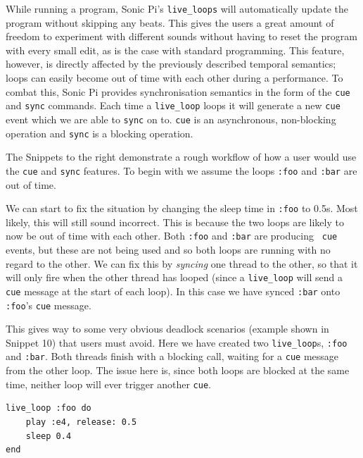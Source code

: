 \documentclass[11pt, abstracton, twoside]{scrartcl}
\begin{document}
While running a program, Sonic Pi's \texttt{live\_loops} will automatically update 
the program without skipping any beats. This gives the users a great amount of 
freedom to experiment with different sounds without having to reset the program
with every small edit, as is the case with standard 
programming. This feature, however, is directly affected by the previously 
described temporal semantics; loops can easily become out of time with 
each other during a performance. To combat this, Sonic Pi provides 
synchronisation semantics in the form of the \texttt{cue} and \texttt{sync} 
commands. Each time a \texttt{live\_loop} loops it will generate a new \texttt{cue} 
event which we are able to \texttt{sync} on to. \texttt{cue} is an asynchronous,
non-blocking operation and \texttt{sync} is a blocking operation.

\begin{multicols}{2}
The Snippets to the right demonstrate a rough workflow of how a user would use 
the \texttt{cue} and \texttt{sync} features. To begin with we assume the loops 
\texttt{:foo} and \texttt{:bar} are out of time.

We can start to fix the situation by 
changing the sleep time in \texttt{:foo} to 0.5s. Most likely, this will still 
sound incorrect. This is because the two loops are likely to now be out of 
time with each other. Both \texttt{:foo} and \texttt{:bar} are producing \texttt{
cue} events, but these are not being used and so both loops are running with 
no regard to the other. We can fix this by \emph{syncing} one thread to the 
other, so that it will only fire when the other thread has looped (since
a \texttt{live\_loop} will send a \texttt{cue} message at the start of each loop).
In this case we have synced \texttt{:bar} onto \texttt{:foo}'s \texttt{cue} 
message.

This gives way to some very obvious deadlock scenarios (example shown in Snippet 10) 
that users must avoid. Here we have created two \texttt{live\_loop}s, \texttt{:foo}
and \texttt{:bar}. Both threads finish with a blocking call, waiting for a
\texttt{cue} message from the other loop. The issue here is, since both loops 
are blocked at the same time, neither loop will ever trigger another \texttt{cue}. 

	\begin{minipage}{0.5\textwidth}

		\begin{minipage}{\textwidth}
			\begin{lstlisting}[style = sonicpi]
live_loop :foo do
    play :e4, release: 0.5
    sleep 0.4
end


\end{lstlisting}
\end{minipage}
\end{minipage}
\end{multicols}
\end{document}

